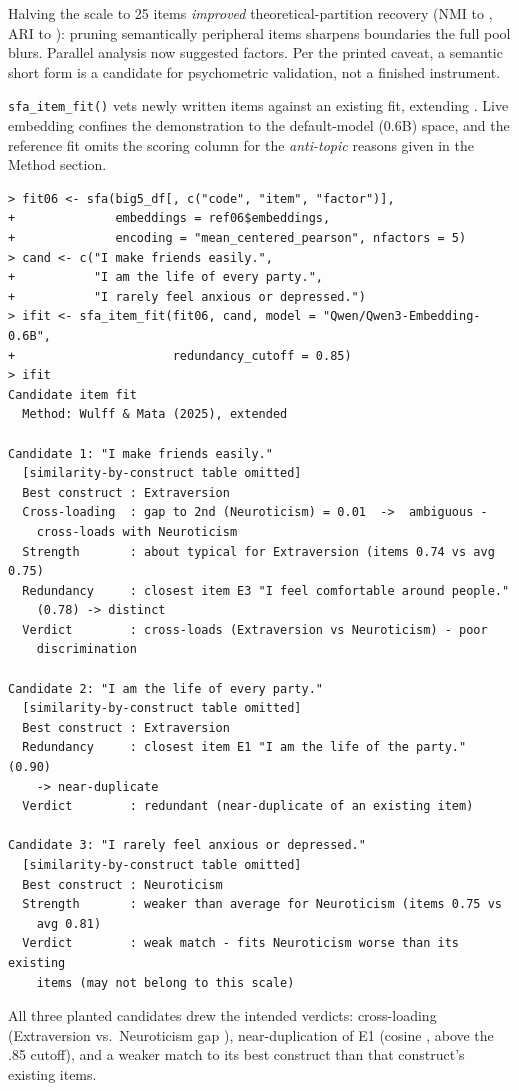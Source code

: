 Halving the scale to 25 items \emph{improved} theoretical-partition
recovery (NMI \valSfNmiFull{} to \valSfNmiRed, ARI \valSfAriFull{} to \valSfAriRed): pruning semantically
peripheral items sharpens boundaries the full pool blurs. Parallel
analysis now suggested \valSfKRedWord{} factors. Per the printed caveat, a semantic
short form is a candidate for psychometric validation, not a finished
instrument.

\texttt{sfa\_item\_fit()} vets newly written items against an existing
fit, extending \citet{wulff-mata-2025}. Live
embedding confines the demonstration to the default-model (0.6B) space,
and the reference fit omits the scoring column for the \emph{anti-topic}
reasons given in the Method section.

{\scriptsize
\begin{verbatim}
> fit06 <- sfa(big5_df[, c("code", "item", "factor")],
+              embeddings = ref06$embeddings,
+              encoding = "mean_centered_pearson", nfactors = 5)
> cand <- c("I make friends easily.",
+           "I am the life of every party.",
+           "I rarely feel anxious or depressed.")
> ifit <- sfa_item_fit(fit06, cand, model = "Qwen/Qwen3-Embedding-0.6B",
+                      redundancy_cutoff = 0.85)
> ifit
Candidate item fit
  Method: Wulff & Mata (2025), extended

Candidate 1: "I make friends easily."
  [similarity-by-construct table omitted]
  Best construct : Extraversion
  Cross-loading  : gap to 2nd (Neuroticism) = 0.01  ->  ambiguous -
    cross-loads with Neuroticism
  Strength       : about typical for Extraversion (items 0.74 vs avg 0.75)
  Redundancy     : closest item E3 "I feel comfortable around people."
    (0.78) -> distinct
  Verdict        : cross-loads (Extraversion vs Neuroticism) - poor
    discrimination

Candidate 2: "I am the life of every party."
  [similarity-by-construct table omitted]
  Best construct : Extraversion
  Redundancy     : closest item E1 "I am the life of the party." (0.90)
    -> near-duplicate
  Verdict        : redundant (near-duplicate of an existing item)

Candidate 3: "I rarely feel anxious or depressed."
  [similarity-by-construct table omitted]
  Best construct : Neuroticism
  Strength       : weaker than average for Neuroticism (items 0.75 vs
    avg 0.81)
  Verdict        : weak match - fits Neuroticism worse than its existing
    items (may not belong to this scale)
\end{verbatim}
}

All three planted candidates drew the intended verdicts: cross-loading
(Extraversion vs.\ Neuroticism gap \valIfGap), near-duplication of E1 (cosine
\valIfNearest, above the .85 cutoff), and a weaker match to its best construct
than that construct's existing items.
